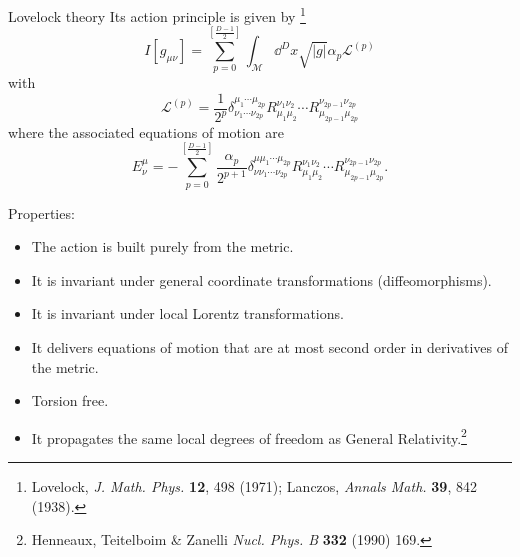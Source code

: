 \documentclass[aspectratio=169,xcolor=dvipsnames]{beamer}
\begin{document}
\begin{frame}{Lovelock theory}\justifying
Its action principle is given by \footnote{Lovelock, \textit{J. Math. Phys.} \textbf{12}, 498 (1971); Lanczos, \textit{Annals Math.} \textbf{39}, 842 (1938).}
    \begin{equation*}
        I[g_{\mu\nu}]=\sum_{p=0}^{\left[\frac{D-1}{2}\right]}\int_{\mathcal{M}}\dd^Dx\sqrt{|g|}\alpha_p\mathcal{L}^{(p)}
    \end{equation*}
with
\begin{equation*}
         \mathcal{L}^{(p)}=\frac{1}{2^p}\delta^{\mu_1\cdots\mu_{2p}}_{\nu_1\cdots\nu_{2p}}R^{\nu_1\nu_2}_{\mu_1\mu_2}\cdots R^{\nu_{2p-1}\nu_{2p}}_{\mu_{2p-1}\mu_{2p}}
\end{equation*}
where the associated equations of motion are
\begin{equation*}
    E^\mu_\nu=-\sum_{p=0}^{\left[\frac{D-1}{2}\right]}\frac{\alpha_p}{2^{p+1}}\delta^{\mu\mu_1\cdots\mu_{2p}}_{\nu\nu_1\cdots\nu_{2p}}R^{\nu_1\nu_2}_{\mu_1\mu_2}\cdots R^{\nu_{2p-1}\nu_{2p}}_{\mu_{2p-1}\mu_{2p}}.
\end{equation*}
\end{frame}

\begin{frame}\justifying
Properties:
 \begin{itemize}
        \item The action is built purely from the metric.
        \item It is invariant under general coordinate transformations (diffeomorphisms).
        \item It is invariant under local Lorentz transformations.
        \item It delivers equations of motion that are at most second order in derivatives of the metric.
        \item Torsion free.
        \item It propagates the same local degrees of freedom as General Relativity.\footnote{Henneaux, Teitelboim \& Zanelli \textit{Nucl. Phys. B} \textbf{332} (1990) 169.}
    \end{itemize}
\end{frame}
\end{document}
